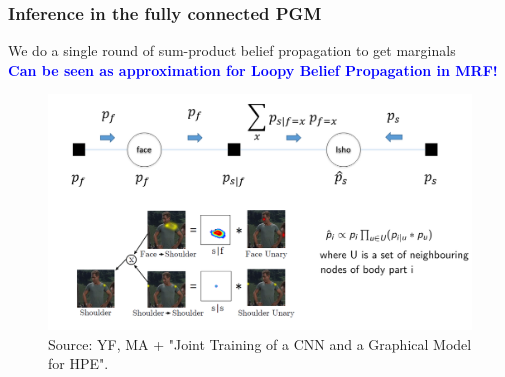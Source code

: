 \documentclass{beamer}
\newcommand\blue[1]{\textcolor{blue}{\textbf{#1}}}
\begin{document}
	\begin{frame}[t]
        \frametitle{Inference in the fully connected PGM}
        \begin{center}
        	We do a single round of sum-product belief propagation to get marginals \\
        	\blue{Can be seen as approximation for Loopy Belief Propagation in MRF!}
            \begin{figure}[htbp] %
            \includegraphics[scale=0.29]{inference.png} \\
            \scriptsize Source: YF, MA + "Joint Training of a CNN and a Graphical Model for HPE".
            \end{figure}
        \end{center}
    \end{frame}
\end{document}
